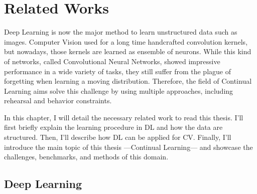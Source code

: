 \chapter{Related Works}
\label{chapter:related}

\begin{chapabstract}
      Deep Learning is now the major method to learn unstructured data such as images. Computer
      Vision used for a long time handcrafted convolution kernels, but nowadays, those kernels are
      learned as ensemble of neurons. While this kind of networks, called Convolutional Neural
      Networks, showed impressive performance in a wide variety of tasks, they still suffer from
      the plague of forgetting when learning a moving distribution. Therefore, the field of
      Continual Learning aims solve this challenge by using multiple approaches, including rehearsal
      and behavior constraints.
\end{chapabstract}

{}



In this chapter, I will detail the necessary related work to read this thesis. I'll first
briefly explain the learning procedure in \acf{DL} and how the data are structured. Then, I'll
describe how \ac{DL} can be applied for \acf{CV}. Finally, I'll introduce the main topic of
this thesis ---Continual Learning--- and showcase the challenges, benchmarks, and methods of
this domain.

\section{Deep Learning}

